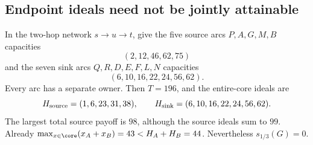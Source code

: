 \subsection{Endpoint ideals need not be jointly attainable}
\begin{theorem}\label{flow:endpoint}
In the two-hop network $s\to u\to t$, give the five source arcs
$P,A,G,M,B$ capacities
\[
                         (2,12,46,62,75)
\]
and the seven sink arcs $Q,R,D,E,F,L,N$ capacities
\[
                         (6,10,16,22,24,56,62).
\]
Every arc has a separate owner. Then $T=196$, and the entire-core ideals
are
\[
 H_{\rm source}=(1,6,23,31,38),\qquad
 H_{\rm sink}=(6,10,16,22,24,56,62).
\]
The largest total source payoff is $98$, although the source ideals sum
to $99$. Already $\max_{x\in\core}(x_A+x_B)=43< H_A+H_B=44$.
Nevertheless $s_{1/3}(G)=0$.
\end{theorem}
